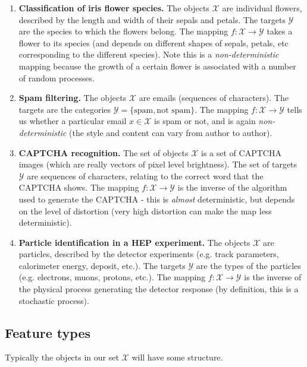 \begin{frameex}
\begin{enumerate}[label = (\roman*)]
\item \textbf{Classification of iris flower species.} The objects $\mathcal{X}$ are individual flowers, described by the length and width of their sepals and petals. The targets $\mathcal{Y}$ are the species to which the flowers belong. The mapping $f : \mathcal{X} \rightarrow \mathcal{Y}$ takes a flower to its species (and depends on different shapes of sepals, petals, etc corresponding to the different species). Note this is a \textit{non-deterministic} mapping because the growth of a certain flower is associated with a number of random processes.
\item \textbf{Spam filtering.} The objects $\mathcal{X}$ are emails (sequences of characters). The targets are the categories $\mathcal{Y} = \{\text{spam}, \text{not spam}\}$. The mapping $f : \mathcal{X} \rightarrow \mathcal{Y}$ tells us whether a particular email $x \in \mathcal{X}$ is spam or not, and is again \textit{non-deterministic} (the style and content can vary from author to author).
\item \textbf{CAPTCHA recognition.} The set of objects $\mathcal{X}$ is a set of CAPTCHA images (which are really vectors of pixel level brightness). The set of targets $\mathcal{Y}$ are sequences of characters, relating to the correct word that the CAPTCHA shows. The mapping $f : \mathcal{X} \rightarrow \mathcal{Y}$ is the inverse of the algorithm used to generate the CAPTCHA - this is \textit{almost} deterministic, but depends on the level of distortion (very high distortion can make the map less deterministic).
\item \textbf{Particle identification in a HEP experiment.} The objects $\mathcal{X}$ are particles, described by the detector experiments (e.g. track parameters, calorimeter energy, deposit, etc.). The targets $\mathcal{Y}$ are the types of the particles (e.g. electrons, muons, protons, etc.). The mapping $f : \mathcal{X} \rightarrow \mathcal{Y}$ is the inverse of the physical process generating the detector response (by definition, this is a stochastic process).
\end{enumerate}
\end{frameex}



\newpage
\subsection{Feature types}
Typically the objects in our set $\mathcal{X}$ will have some structure.

